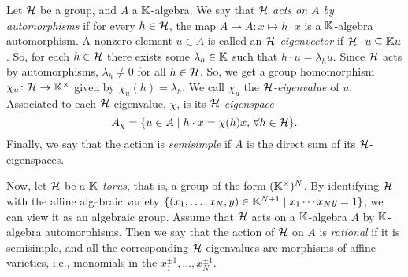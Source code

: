 Let $\mathcal{H}$ be a group, and $A$ a $\mathbb{K}$-algebra. We say that $\mathcal{H}$ \emph{acts on $A$
	by automorphisms} if for every $h \in \mathcal{H}$, the map $A
	\to A \colon x \mapsto h \cdot x$ is a $\mathbb{K}$-algebra automorphism. A nonzero element
$u \in A$ is called an \emph{$\mathcal{H}$-eigenvector} if $\mathcal{H}
	\cdot u \subseteq \mathbb{K} u$. So, for each $h \in \mathcal{H}$ there exists some $\lambda_h \in
	\mathbb{K}$ such that $h \cdot u = \lambda_h u$. Since $\mathcal{H}$ acts by automorphisms,
$\lambda_h \neq 0$ for all $h \in \mathcal{H}$. So, we get a group homomorphism $\chi_u \colon
	\mathcal{H} \to \mathbb{K}^\times$ given by $\chi_u(h) = \lambda_h$. We call $\chi_u$ the \emph{$\mathcal{H}$-eigenvalue} of $u$. Associated
to each $\mathcal{H}$-eigenvalue, $\chi$, is its
\emph{$\mathcal{H}$-eigenspace}
\begin{equation*}
	A_\chi = \{u \in A \mid h \cdot x = \chi(h)x,\, \forall h \in \mathcal{H} \}.
\end{equation*}
%
Finally, we say that the action is \emph{semisimple} if $A$ is
the direct sum of its $\mathcal{H}$-eigenspaces.

Now, let $\mathcal{H}$ be a \emph{$\mathbb{K}$-torus}, that is, a group of the form
$(\mathbb{K}^\times)^N$. By identifying $\mathcal{H}$ with the affine algebraic variety $\{(x_1,
	\dots, x_N, y) \in \mathbb{K}^{N+1} \mid x_1 \cdots x_N y = 1\}$, we can view it as an
algebraic group. Assume that $\mathcal{H}$ acts on a $\mathbb{K}$-algebra $A$ by $\mathbb{K}$-algebra
automorphisms. Then we say that the action of $\mathcal{H}$ on $A$ is
\emph{rational} if it is semisimple, and all the corresponding
$\mathcal{H}$-eigenvalues are morphisms of affine varieties, i.e., monomials in the $x_1^{\pm
	1}, \dotsc, x_N^{\pm 1}$.


